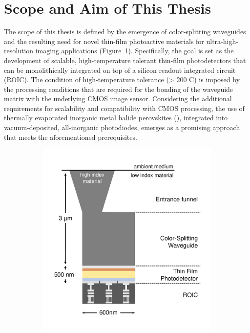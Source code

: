 \section{Scope and Aim of This Thesis} \label{sec:scope_and_aim}

The scope of this thesis is defined by the emergence of color-splitting waveguides and the resulting need for novel thin-film photoactive materials for ultra-high-resolution imaging applications (Figure~\ref{fig:ch1:scope}). Specifically, the goal is set as the development of scalable, high-temperature tolerant thin-film photodetectors that can be monolithically integrated on top of a silicon readout integrated circuit (ROIC). The condition of high-temperature tolerance (> 200 \degree C) is imposed by the processing conditions that are required for the bonding of the waveguide matrix with the underlying CMOS image sensor. Considering the additional requirements for scalability and compatibility with CMOS processing, the use of thermally evaporated inorganic metal halide perovskites (), integrated into vacuum-deposited, all-inorganic photodiodes, emerges as a promising approach that meets the aforementioned prerequisites.


\begin{figure}[htbp]
    \centering
    \begin{subfigure}[t]{0.7\textwidth} %
        \centering
        \includegraphics[width=\textwidth]{chapters/introduction/image/waveguide_pepd.pdf} %
    \end{subfigure}

    \caption{}
    \label{fig:ch1:scope}
\end{figure}


